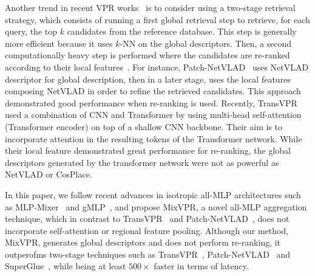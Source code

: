 \documentclass[10pt,twocolumn,letterpaper]{article}
\begin{document}
Another trend in recent VPR works~\cite{hausler2021patch, wang2022transvpr} is to consider using a two-stage retrieval strategy, which consists of running a first global retrieval step to retrieve, for each query, the top $k$ candidates from the reference database. This step is generally more efficient because it uses $k$-NN on the global descriptors. Then, a second computationally heavy step is performed where the candidates are re-ranked according to their local features~\cite{taira2018inloc, sarlin2019coarse, sarlin2020superglue}. For instance, Patch-NetVLAD~\cite{hausler2021patch} uses NetVLAD descriptor for global description, then in a later stage, uses the local features composing NetVLAD in order to refine the retrieved candidates. This approach demonstrated good performance when re-ranking is used. Recently, TransVPR~\cite{wang2022transvpr} used a combination of CNN and Transformer by using multi-head self-attention (Transformer encoder) on top of a shallow CNN backbone. Their aim is to incorporate attention in the resulting tokens of the Transformer network. While their local feature demonstrated great performance for re-ranking, the global descriptors generated by the transformer network were not as powerful as NetVLAD or CosPlace.

In this paper, we follow recent advances in isotropic all-MLP architectures such as MLP-Mixer~\cite{tolstikhin2021mlp} and gMLP~\cite{liu2021pay}, and propose MixVPR, a novel all-MLP aggregation technique, which in contrast to TransVPR~\cite{wang2022transvpr} and Patch-NetVLAD~\cite{hausler2021patch}, does not incorporate self-attention or regional feature pooling. Although our method, MixVPR, generates global descriptors and does not perform re-ranking, it outperofms two-stage techniques such as TransVPR~\cite{wang2022transvpr}, Patch-NetVLAD~\cite{hausler2021patch} and SuperGlue~\cite{sarlin2020superglue}, while being at least $500\times$ faster in terms of latency.
\end{document}
